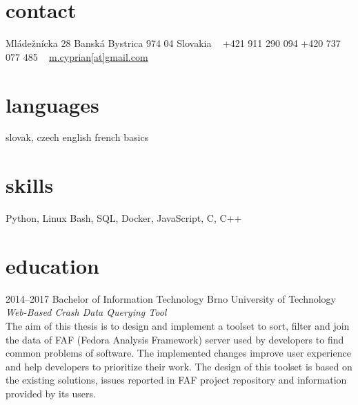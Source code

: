 \documentclass[]{friggeri-cv} %
\begin{document}


\begin{aside} %
\section{contact}
Mládežnícka 28
Banská Bystrica 974 04
Slovakia
~
+421 911 290 094
+420 737 077 485
~
\href{mailto:m.cyprian@gmail.com}{m.cyprian[at]gmail.com}
\section{languages}
slovak, czech
english
french basics
\section{skills}
Python, Linux
Bash, SQL, Docker, JavaScript, C, C++
\end{aside}


\section{education}

\begin{entrylist}


\entry
{2014--2017}
{Bachelor {\normalfont of Information Technology}}
{Brno University of Technology}
{\emph{Web-Based Crash Data Querying Tool} \\ The aim of this thesis is to design and implement a toolset to sort, filter and join the data of FAF (Fedora Analysis Framework) server used by developers to find common problems of software. The implemented changes improve user experience and help developers to prioritize their work. The design of this toolset is based on the existing solutions, issues reported in FAF project repository and information provided by its users.}

\end{entrylist}
\end{document}
